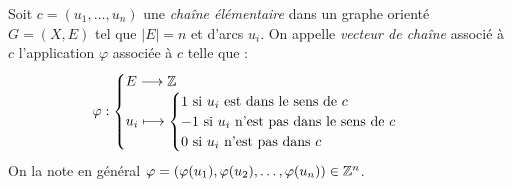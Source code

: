 


\begin{definition}
    Soit $c = (u_1, \dots, u_n)$ une \emph{chaîne élémentaire} dans 
    un graphe orienté $ G = (X, E)$ tel que $ |E| = n $ et d'arcs $ u_i$. 
    On appelle \emph{vecteur de chaîne} associé à $c$ l'application $ \varphi$ associée à $c$ telle que : 
        $$ 
            \varphi : 
                \begin{cases}
                    E \longrightarrow \mathbb{Z} \\ 
                    u_i \longmapsto 
                        \begin{cases}
                            1 \text{ si } u_i \text{ est dans le sens de } c \\ 
                            -1 \text{ si } u_i \text{ n'est pas dans le sens de } c \\ 
                            0 \text{ si } u_i \text{ n'est pas dans } c \\
                            \end{cases}
                \end{cases}
        $$
    On la note en général $ \varphi = ( \varphi(u_1), \varphi(u_2), \dots, \varphi(u_n)) \in \mathbb{Z}^n$. 
\end{definition}

